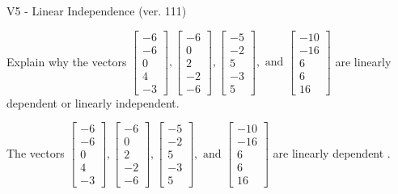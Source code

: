 \begin{exercise}
  \begin{exerciseTitle}V5 - Linear Independence (ver. 111)\end{exerciseTitle}
  \begin{exerciseStatement}
    Explain why the vectors \(\left[\begin{array}{r}
-6 \\
-6 \\
0 \\
4 \\
-3
\end{array}\right] , \left[\begin{array}{r}
-6 \\
0 \\
2 \\
-2 \\
-6
\end{array}\right] , \left[\begin{array}{r}
-5 \\
-2 \\
5 \\
-3 \\
5
\end{array}\right] , \text{ and } \left[\begin{array}{r}
-10 \\
-16 \\
6 \\
6 \\
16
\end{array}\right]\) are linearly dependent or linearly independent.	


  \end{exerciseStatement}
  \begin{exerciseAnswer}
   The vectors \(\left[\begin{array}{r}
-6 \\
-6 \\
0 \\
4 \\
-3
\end{array}\right] , \left[\begin{array}{r}
-6 \\
0 \\
2 \\
-2 \\
-6
\end{array}\right] , \left[\begin{array}{r}
-5 \\
-2 \\
5 \\
-3 \\
5
\end{array}\right] , \text{ and } \left[\begin{array}{r}
-10 \\
-16 \\
6 \\
6 \\
16
\end{array}\right]\) are 
  	 linearly dependent  .
  


  \end{exerciseAnswer}
\end{exercise}